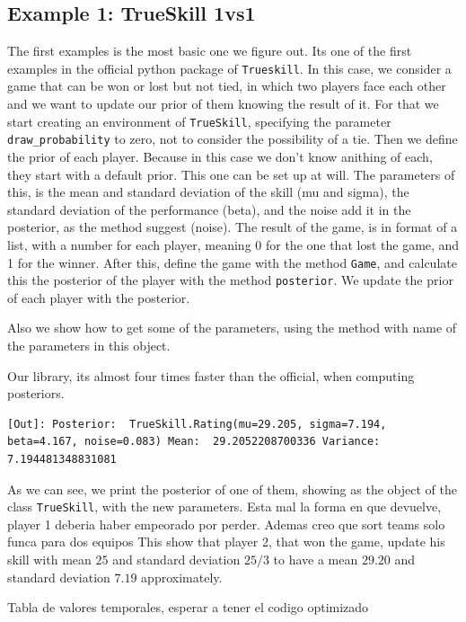 \documentclass[article]{jss}
\begin{document}
\subsection{Example 1: TrueSkill 1vs1}
The first examples is the most basic one we figure out. Its one of the first examples in the official python package of \texttt{Trueskill}.
In this case, we consider a game that can be won or lost but not tied, in which two players face each other and we want to update our prior of them knowing the result of it.
For that we start creating an environment of \texttt{TrueSkill}, specifying the parameter \texttt{draw\_probability} to zero, not to consider the possibility of a tie.
Then we define the prior of each player. 
Because in this case we don't know anithing of each, they start with a default prior.
This one can be set up at will.
The parameters of this, is the mean and standard deviation of the skill (mu and sigma), the standard deviation of the performance (beta), and the noise add it in the posterior, as the method suggest (noise).
The result of the game, is in format of a list, with a number for each player, meaning 0 for the one that lost the game, and 1 for the winner.
After this, define the game with the method \texttt{Game}, and calculate this the posterior of the player with the method \texttt{posterior}.
We update the prior of each player with the posterior.

Also we show how to get some of the parameters, using the method with name of the parameters in this object.

Our library, its almost four times faster than the official, when computing posteriors.

\begin{lstlisting}
[Out]: Posterior:  TrueSkill.Rating(mu=29.205, sigma=7.194, beta=4.167, noise=0.083) Mean:  29.2052208700336 Variance:  7.194481348831081
\end{lstlisting}

As we can see, we print the posterior of one of them, showing as the object of the class \texttt{TrueSkill}, with the new parameters.
Esta mal la forma en que devuelve, player 1 deberia haber empeorado por perder. Ademas creo que sort teams solo funca para dos equipos
This show that player 2, that won the game, update his skill with mean $25$ and standard deviation $25/3$ to have a mean $29.20$ and standard deviation $7.19$ approximately.

Tabla de valores temporales, esperar a tener el codigo optimizado 
\end{document}
